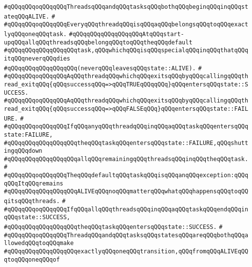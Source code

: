 \verb|#qQQqqQQqoqQQqqQQqThreadsqQQqandqQQqtasksqQQqbothqQQqbeginqQQqinqQQqstateqQQqALIVE.|\newline
\verb|#|\newline
\verb|#qQQqqQQqoqQQqqQQqEveryqQQqthreadqQQqisqQQqaqQQqbelongsqQQqtoqQQqexactlyqQQqoneqQQqtask.|\newline
\verb|#qQQqqQQqqQQqqQQqqQQqAtqQQqstart-upqQQqallqQQqthreadsqQQqbelongqQQqtoqQQqtheqQQqdefault|\newline
\verb|#qQQqqQQqqQQqqQQqqQQqtask,qQQqwhichqQQqisqQQqspecialqQQqinqQQqthatqQQqitqQQqneverqQQqdies|\newline
\verb|#qQQqqQQqqQQqqQQqqQQq(neverqQQqleavesqQQqstate::ALIVE).|\newline
\verb|#|\newline
\verb|#qQQqqQQqoqQQqqQQqAqQQqthreadqQQqwhichqQQqexitsqQQqbyqQQqcallingqQQqthread_exitqQQq{qQQqsuccessqQQq=>qQQqTRUEqQQqqQQq}qQQqentersqQQqstate::SUCCESS.|\newline
\verb|#qQQqqQQqoqQQqqQQqAqQQqthreadqQQqwhichqQQqexitsqQQqbyqQQqcallingqQQqthread_exitqQQq{qQQqsuccessqQQq=>qQQqFALSEqQQq}qQQqentersqQQqstate::FAILURE.|\newline
\verb|#|\newline
\verb|#qQQqqQQqoqQQqqQQqIfqQQqanyqQQqthreadqQQqinqQQqaqQQqtaskqQQqentersqQQqstate:FAILURE,|\newline
\verb|#qQQqqQQqqQQqqQQqqQQqtheqQQqtaskqQQqentersqQQqstate::FAILURE,qQQqshuttingqQQqdown|\newline
\verb|#qQQqqQQqqQQqqQQqqQQqallqQQqremainingqQQqthreadsqQQqinqQQqtheqQQqtask.|\newline
\verb|#|\newline
\verb|#qQQqqQQqoqQQqqQQqTheqQQqdefaultqQQqtaskqQQqisqQQqanqQQqexception:qQQqqQQqItqQQqremains|\newline
\verb|#qQQqqQQqqQQqqQQqqQQqALIVEqQQqnoqQQqmatterqQQqwhatqQQqhappensqQQqtoqQQqitsqQQqthreads.|\newline
\verb|#|\newline
\verb|#qQQqqQQqoqQQqqQQqIfqQQqallqQQqthreadsqQQqinqQQqaqQQqtaskqQQqendqQQqinqQQqstate::SUCCESS,|\newline
\verb|#qQQqqQQqqQQqqQQqqQQqtheqQQqtaskqQQqentersqQQqstate::SUCCESS.|\newline
\verb|#|\newline
\verb|#qQQqqQQqoqQQqqQQqThreadqQQqandqQQqtasksqQQqstatesqQQqareqQQqbothqQQqallowedqQQqtoqQQqmake|\newline
\verb|#qQQqqQQqqQQqqQQqqQQqexactlyqQQqoneqQQqtransition,qQQqfromqQQqALIVEqQQqtoqQQqoneqQQqof|\newline
